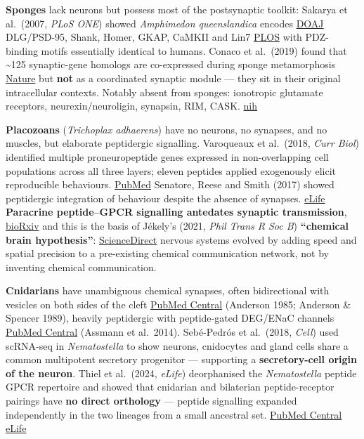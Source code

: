 \textbf{Sponges} lack neurons but possess most of the postsynaptic toolkit: Sakarya et al.~(2007, \emph{PLoS ONE}) showed \emph{Amphimedon queenslandica} encodes \href{https://doaj.org/article/93cf76d6361d47a4b4bde8d2ea666f82}{DOAJ} DLG/PSD-95, Shank, Homer, GKAP, CaMKII and Lin7 \href{https://journals.plos.org/plosone/article?id=10.1371/journal.pone.0000506}{PLOS} with PDZ-binding motifs essentially identical to humans. Conaco et al.~(2019) found that \textasciitilde125 synaptic-gene homologs are co-expressed during sponge metamorphosis \href{https://www.nature.com/articles/s41598-019-51282-x}{Nature} but \textbf{not} as a coordinated synaptic module --- they sit in their original intracellular contexts. Notably absent from sponges: ionotropic glutamate receptors, neurexin/neuroligin, synapsin, RIM, CASK. \href{https://www.ncbi.nlm.nih.gov/pmc/articles/PMC6823388/}{nih}

\textbf{Placozoans} (\emph{Trichoplax adhaerens}) have no neurons, no synapses, and no muscles, but elaborate peptidergic signalling. Varoqueaux et al.~(2018, \emph{Curr Biol}) identified multiple proneuropeptide genes expressed in non-overlapping cell populations across all three layers; eleven peptides applied exogenously elicit reproducible behaviours. \href{https://pubmed.ncbi.nlm.nih.gov/30344118/}{PubMed} Senatore, Reese and Smith (2017) showed peptidergic integration of behaviour despite the absence of synapses. \href{https://elifesciences.org/articles/26349}{eLife} \textbf{Paracrine peptide--GPCR signalling antedates synaptic transmission}, \href{https://www.biorxiv.org/content/10.1101/360925v1}{bioRxiv} and this is the basis of Jékely's (2021, \emph{Phil Trans R Soc B}) \textbf{``chemical brain hypothesis''}: \href{https://www.sciencedirect.com/science/article/abs/pii/S095943882100129X}{ScienceDirect} nervous systems evolved by adding speed and spatial precision to a pre-existing chemical communication network, not by inventing chemical communication.

\textbf{Cnidarians} have unambiguous chemical synapses, often bidirectional with vesicles on both sides of the cleft \href{https://pmc.ncbi.nlm.nih.gov/articles/PMC5285349/}{PubMed Central} (Anderson 1985; Anderson \& Spencer 1989), heavily peptidergic with peptide-gated DEG/ENaC channels \href{https://pmc.ncbi.nlm.nih.gov/articles/PMC11087051/}{PubMed Central} (Assmann et al.~2014). Sebé-Pedrós et al.~(2018, \emph{Cell}) used scRNA-seq in \emph{Nematostella} to show neurons, cnidocytes and gland cells share a common multipotent secretory progenitor --- supporting a \textbf{secretory-cell origin of the neuron}. Thiel et al.~(2024, \emph{eLife}) deorphanised the \emph{Nematostella} peptide GPCR repertoire and showed that cnidarian and bilaterian peptide-receptor pairings have \textbf{no direct orthology} --- peptide signalling expanded independently in the two lineages from a small ancestral set. \href{https://pmc.ncbi.nlm.nih.gov/articles/PMC11087051/}{PubMed Central} \href{https://elifesciences.org/articles/90674}{eLife}

